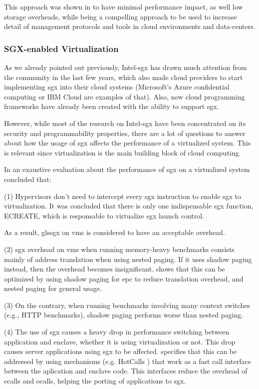 This approach was shown in \cite{sgxCloudThesis} to have minimal performance impact, as well low storage overheads, while being a compelling approach to be used to increase detail of management protocols and tools in cloud environments and data-centers.


\subsubsection{SGX-enabled Virtualization}
\label{sssec:sgxVirt}


As we already pointed out previously, Intel-\gls{sgx} has drawn much attention from the community in the last few years, which also made cloud providers to start implementing \gls{sgx} into their cloud systems (Microsoft's Azure confidential computing or IBM Cloud are examples of that). Also, new cloud programming frameworks have already been created with the ability to support \gls{sgx}. 

However, while most of the research on Intel-\gls{sgx} have been concentrated on its security and programmability properties, there are a lot of questions to answer about how the usage of \gls{sgx} affects the performance of a virtualized system. This is relevant since virtualization is the main building block of cloud computing.

In \cite{sgxVirtualizationPaper} an exaustive evaluation about the performance of \gls{sgx} on a virtualized system concluded that:

(1) Hypervisors don't need to intercept every \gls{sgx} instruction to enable \gls{sgx} to virtualization. It was concluded that there is only one indispensable \gls{sgx} function, ECREATE, which is responsable to virtualize \gls{sgx} launch control.

As a result, gls{sgx} on \gls{vm}s is considered to have an acceptable overhead.

(2)  \gls{sgx} overhead on \gls{vm}s when running memory-heavy benchmarks consists mainly of address translation when using nested paging. If it uses shadow paging instead, then the overhead becomes insignificant. 
\cite{sgxVirtualizationPaper} shows that this can be optimized by using shadow paging for \gls{epc} to reduce translation overhead, and nested paging for general usage.

(3) On the contrary, when running benchmarks involving many context switches (e.g., HTTP benchmarks), shadow paging performs worse than nested paging.

(4) The use of \gls{sgx} causes a heavy drop in performance switching between application and enclave, whether it is using virtualization or not. This drop causes server applications using \gls{sgx} to be affected.
\cite{sgxVirtualizationPaper} specifies that this can be addressed by using mechanisms (e.g. HotCalls \cite{hotcallsPaper}) that work as a fast call interface between the aplication and enclave code. This interfaces reduce the overhead of ecalls and ocalls, helping the porting of applications to \gls{sgx}.

